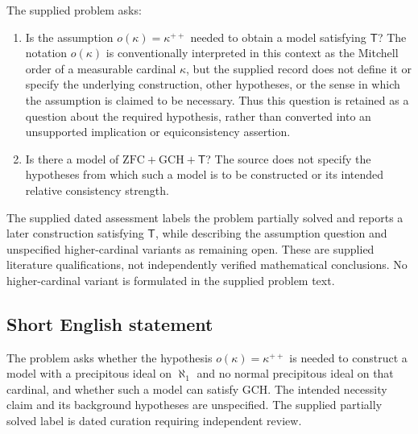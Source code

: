 \documentclass[11pt]{article}
\begin{document}
The supplied problem asks:
\begin{enumerate}
\item Is the assumption \(o(\kappa)=\kappa^{++}\) needed to obtain a model satisfying \(\mathsf T\)? The notation \(o(\kappa)\) is conventionally interpreted in this context as the Mitchell order of a measurable cardinal \(\kappa\), but the supplied record does not define it or specify the underlying construction, other hypotheses, or the sense in which the assumption is claimed to be necessary. Thus this question is retained as a question about the required hypothesis, rather than converted into an unsupported implication or equiconsistency assertion.
\item Is there a model of \(\mathrm{ZFC}+\mathrm{GCH}+\mathsf T\)? The source does not specify the hypotheses from which such a model is to be constructed or its intended relative consistency strength.
\end{enumerate}
The supplied dated assessment labels the problem partially solved and reports a later construction satisfying \(\mathsf T\), while describing the assumption question and unspecified higher-cardinal variants as remaining open. These are supplied literature qualifications, not independently verified mathematical conclusions. No higher-cardinal variant is formulated in the supplied problem text.
\subsection{Short English statement}
The problem asks whether the hypothesis \(o(\kappa)=\kappa^{++}\) is needed to construct a model with a precipitous ideal on \(\aleph_1\) and no normal precipitous ideal on that cardinal, and whether such a model can satisfy GCH. The intended necessity claim and its background hypotheses are unspecified. The supplied partially solved label is dated curation requiring independent review.
\end{document}
